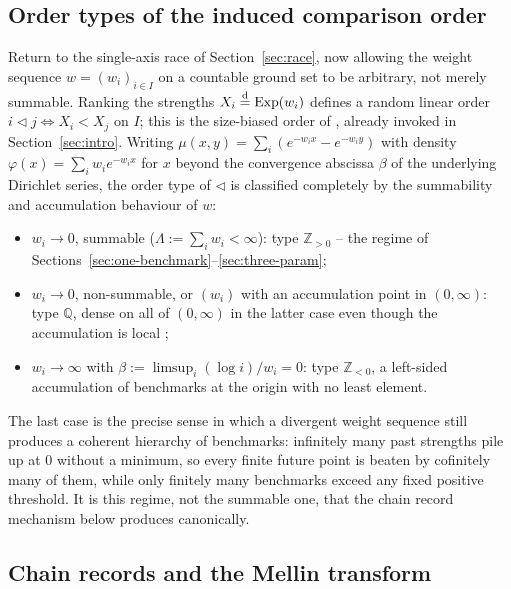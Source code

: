 \documentclass[11pt]{article}
\newcommand{\ZZ}{\mathbb{Z}}
\DeclareMathOperator{\Exp}{Exp}
\theoremstyle{plain}
\theoremstyle{definition}
\begin{document}
\subsection{Order types of the induced comparison order}
\label{sec:order-types}

Return to the single-axis race of Section~\ref{sec:race}, now allowing the
weight sequence \(w=(w_i)_{i\in I}\) on a countable ground set to be arbitrary,
not merely summable. Ranking the strengths \(X_i\stackrel{\rm d}=\Exp(w_i)\)
defines a random linear order \(i\triangleleft j\iff X_i<X_j\) on \(I\); this
is the size-biased order of \cite{GnedinSizeBiased2023}, already invoked in
Section~\ref{sec:intro}. Writing \(\mu(x,y)=\sum_i(e^{-w_ix}-e^{-w_iy})\) with
density \(\varphi(x)=\sum_iw_ie^{-w_ix}\) for \(x\) beyond the convergence
abscissa \(\beta\) of the underlying Dirichlet series, the order type of
\(\triangleleft\) is classified completely by the summability and
accumulation behaviour of \(w\):
\begin{itemize}[leftmargin=*]
\item \(w_i\to0\), summable (\(\Lambda:=\sum_iw_i<\infty\)): type \(\ZZ_{>0}\)
-- the regime of Sections~\ref{sec:one-benchmark}--\ref{sec:three-param};
\item \(w_i\to0\), non-summable, or \((w_i)\) with an accumulation point in
\((0,\infty)\): type \(\mathbb Q\), dense on all of \((0,\infty)\) in the
latter case even though the accumulation is local
;
\item \(w_i\to\infty\) with \(\beta:=\limsup_i(\log i)/w_i=0\): type
\(\ZZ_{<0}\), a left-sided accumulation of benchmarks at the origin with no
least element.
\end{itemize}
The last case is the precise sense in which a divergent weight sequence still
produces a coherent hierarchy of benchmarks: infinitely many past strengths
pile up at \(0\) without a minimum, so every finite future point is beaten by
cofinitely many of them, while only finitely many benchmarks exceed any fixed
positive threshold. It is this regime, not the summable one, that the chain
record mechanism below produces canonically.

\subsection{Chain records and the Mellin transform}
\label{sec:chain-mellin}
\end{document}
